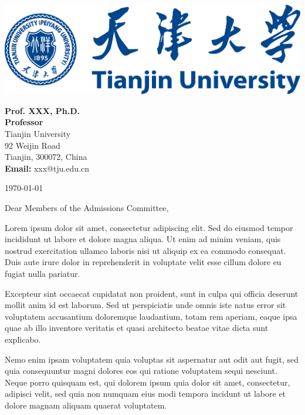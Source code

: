 \documentclass[10pt,a4paper]{article}
\begin{document}
\pagestyle{empty}

\begin{flushright}
\begin{minipage}{0.3\textwidth}
\raggedright
\includegraphics[width=\textwidth]{tju_tp.pdf}

\vspace{1em}

\textbf{Prof. XXX, Ph.D.}\\
\textbf{Professor}\\
Tianjin University\\
92 Weijin Road\\
Tianjin, 300072, China\\
\textbf{Email:} xxx@tju.edu.cn
\end{minipage}
\end{flushright}

\vspace{2em}

\today

\vspace{1em}

Dear Members of the Admissions Committee,

\vspace{1em}

Lorem ipsum dolor sit amet, consectetur adipiscing elit. Sed do eiusmod tempor incididunt ut labore et dolore magna aliqua. Ut enim ad minim veniam, quis nostrud exercitation ullamco laboris nisi ut aliquip ex ea commodo consequat. Duis aute irure dolor in reprehenderit in voluptate velit esse cillum dolore eu fugiat nulla pariatur.

Excepteur sint occaecat cupidatat non proident, sunt in culpa qui officia deserunt mollit anim id est laborum. Sed ut perspiciatis unde omnis iste natus error sit voluptatem accusantium doloremque laudantium, totam rem aperiam, eaque ipsa quae ab illo inventore veritatis et quasi architecto beatae vitae dicta sunt explicabo.

Nemo enim ipsam voluptatem quia voluptas sit aspernatur aut odit aut fugit, sed quia consequuntur magni dolores eos qui ratione voluptatem sequi nesciunt. Neque porro quisquam est, qui dolorem ipsum quia dolor sit amet, consectetur, adipisci velit, sed quia non numquam eius modi tempora incidunt ut labore et dolore magnam aliquam quaerat voluptatem.
\end{document}
